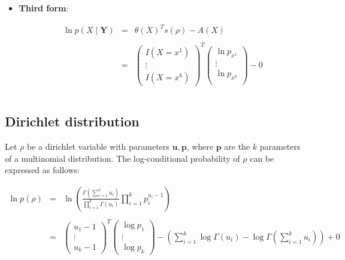 \documentclass[11pt, oneside]{article}   	%
\numberwithin{figure}{section}
\numberwithin{equation}{section}
\numberwithin{table}{section}
\theoremstyle{definition}
\begin{document}
\begin{appendices}
\begin{itemize}
\vspace{0.5in}
\item \textbf{Third form}:


\begin{eqnarray*}
\ln p(X \mid \mathbf{Y}) &=& \theta(X)^Ts(\rho) - A(X) \\ \\
&=&
\begin{pmatrix}
I(X=x^1) \\
\vdots \\
I(X=x^k) 
\end{pmatrix}^T
\begin{pmatrix}
\ln p_{x^1}\\
\vdots \\
\ln p_{x^k} \\
\end{pmatrix}
- 0 \\ \\
\end{eqnarray*}

\end{itemize}


\subsection{Dirichlet distribution}

Let $\rho$ be a dirichlet variable with parameters $\mathbf{u}, \mathbf{p}$, where $\mathbf{p}$ are the $k$ parameters of a multinomial distribution. The log-conditional probability of $\rho$ can be expressed as follows:

\begin{eqnarray*}
\ln p(\rho) &=& \ln \left( \frac{\Gamma ( \sum_{i=1}^k u_i )}{\prod_{i=1}^k \Gamma(u_i)} \prod_{i=1}^k p_i^{u_i-1} \right)\\\\
&=&
\begin{pmatrix}
u_1 - 1\\
\vdots\\
u_k -1
\end{pmatrix}^T
\begin{pmatrix}
\log{p_1} \\
\vdots\\
\log{p_k}
\end{pmatrix}
- \left( \sum_{i=1}^k \log \Gamma(u_i) - \log{\Gamma ( \sum_{i=1}^k u_i )} \right) + 0
\end{eqnarray*}


\end{appendices}
\end{document}

